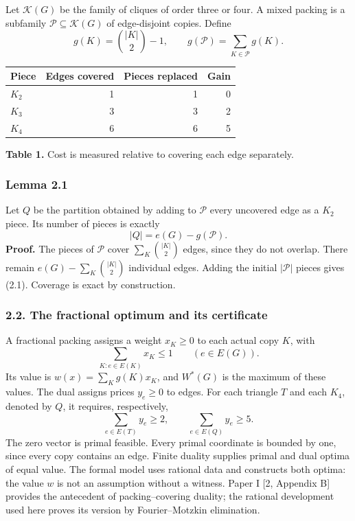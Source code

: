 \documentclass[english,11pt,a4paper]{article}
\newcounter{none}
\begin{document}
Let \(\mathcal K(G)\) be the family of cliques of order three or four. A mixed packing is a subfamily \(\mathcal P\subseteq\mathcal K(G)\) of edge-disjoint copies. Define \[
g(K)=\binom{|K|}{2}-1,\qquad
g(\mathcal P)=\sum_{K\in\mathcal P}g(K).
\]


{\def\LTcaptype{none} %
\begin{longtable}[c]{@{}lrrr@{}}
\toprule\noalign{}
Piece & Edges covered & Pieces replaced & Gain \\
\midrule\noalign{}
\endhead
\bottomrule\noalign{}
\endlastfoot
\(K_2\) & 1 & 1 & 0 \\
\(K_3\) & 3 & 3 & 2 \\
\(K_4\) & 6 & 6 & 5 \\
\end{longtable}
}

\textbf{Table 1.} Cost is measured relative to covering each edge separately.

\subsubsection{Lemma 2.1}\label{lemma-2.1}

Let \(Q\) be the partition obtained by adding to \(\mathcal P\) every uncovered edge as a \(K_2\) piece. Its number of pieces is exactly \[
|Q|=e(G)-g(\mathcal P).
\tag{2.1}
\] \textbf{Proof.} The pieces of \(\mathcal P\) cover \(\sum_K\binom{|K|}{2}\) edges, since they do not overlap. There remain \(e(G)-\sum_K\binom{|K|}{2}\) individual edges. Adding the initial \(|\mathcal P|\) pieces gives (2.1). Coverage is exact by construction.

\subsubsection{2.2. The fractional optimum and its certificate}\label{the-fractional-optimum-and-its-certificate}

A fractional packing assigns a weight \(x_K\ge0\) to each actual copy \(K\), with \[
\sum_{K:e\in E(K)}x_K\le1\qquad(e\in E(G)).
\tag{2.2}
\] Its value is \(w(x)=\sum_K g(K)x_K\), and \(W^*(G)\) is the maximum of these values. The dual assigns prices \(y_e\ge0\) to edges. For each triangle \(T\) and each \(K_4\), denoted by \(Q\), it requires, respectively, \[
\sum_{e\in E(T)}y_e\ge2,\qquad
\sum_{e\in E(Q)}y_e\ge5.
\tag{2.3}
\] The zero vector is primal feasible. Every primal coordinate is bounded by one, since every copy contains an edge. Finite duality supplies primal and dual optima of equal value. The formal model uses rational data and constructs both optima: the value \(w\) is not an assumption without a witness. Paper I {[}2, Appendix B{]} provides the antecedent of packing--covering duality; the rational development used here proves its version by Fourier--Motzkin elimination.
\end{document}
